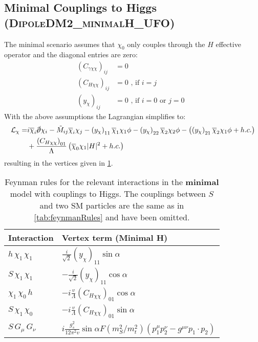 \documentclass[a4paper,11pt]{article}
\begin{document}
\newpage
\clearpage
\subsection{Minimal Couplings to Higgs (\textsc{\small DipoleDM2\_minimalH\_UFO})}

The minimal scenario assumes that $\chi_0$ only couples through the $H$ effective operator and the diagonal entries are zero:
\begin{align}
	(C_{\gamma\chi\chi})_{ij} &= 0\\
	(C_{H\chi\chi})_{ij} &= 0 \mbox{ , if $i = j$} \\
	(y_{\chi})_{ij} & = 0 \mbox{ , if $i = 0$ or $j = 0$ }
\end{align}
With the above assumptions the Lagrangian simplifies to:
\begin{align}
	\mathcal{L}_{\chi} = &  i \overline{\chi}_i \cancel \partial \chi_i - \tilde{M}_{ij} \overline{\chi}_i \chi_j - \left(y_\chi\right)_{11} \overline{\chi}_1 \chi_1 \phi - \left(y_\chi\right)_{22} \overline{\chi}_2 \chi_2 \phi - \left(\left(y_\chi\right)_{21} \overline{\chi}_2 \chi_1 \phi + h.c.\right) \\
	& + \frac{\left(C_{H \chi \chi}\right)_{01}}{\Lambda} \left( \overline{\chi}_0 \chi_1 |H|^2 + h.c.\right)
\end{align}
resulting in the vertices given in \cref{tab:feynmanRulesH}.

\begin{table}[h!]   \centering
	\vspace{0.2cm}
	\begin{tabular}{p{2cm}|p{8.5cm}}
		\toprule
		\textbf{Interaction} & \textbf{Vertex term (Minimal H)}\\ \toprule 
		$h\, \chi_1\,\chi_1$ & $\frac{i}{\sqrt{2}} (y_{\chi})_{11} \sin\alpha$\\
		$S\,\chi_1\,\chi_1$  & $-\frac{i}{\sqrt{2}} (y_{\chi})_{11} \cos\alpha $\\
		$\chi_1\,\chi_0\,h$  & $-i \frac{v}{\Lambda} (C_{H\chi\chi})_{01} \cos\alpha$\\
		$S\,\chi_1\,\chi_0$ &  $-i \frac{v}{\Lambda} (C_{H\chi\chi})_{01} \sin\alpha$\\
    	$S\,G_\mu\,G_\nu$  & $i \frac{g_s^2}{12 \pi^2 v} \sin\alpha F(m^2_S/m^2_t) (p_1^\mu p_2^\nu - g^{\mu\nu} p_1\cdot p_2) $\\
		\bottomrule        
	\end{tabular}
	\caption{Feynman rules for the relevant interactions in the {\bf minimal} model with couplings to Higgs. The couplings between $S$ and two SM particles are the same as in \cref{tab:feynmanRules} and have been omitted. \label{tab:feynmanRulesH}}
\end{table}
\end{document}
